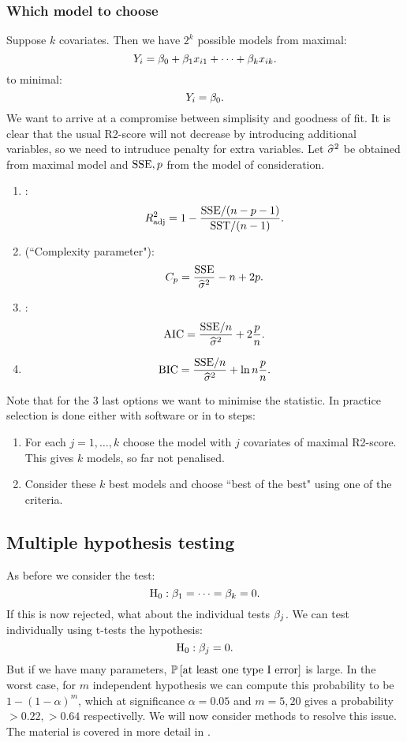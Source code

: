 \subsubsection{Which model to choose}
Suppose $k$ covariates. Then we have $2^k$ possible models from maximal:
$$
    Y_i = \beta_0+\beta_1x_{i1} + \dots + \beta_kx_{ik}.
$$
to minimal:
$$
    Y_i = \beta_0.
$$
We want to arrive at a compromise between simplisity and goodness of fit. It is clear that the usual R2-score will not decrease by introducing additional variables, so we need to intruduce penalty for extra variables. Let $\widehat{\sigma}^2$ be obtained from maximal model and $\mathrm{SSE}, p$ from the model of consideration.
\begin{enumerate}
    \item {}:
    $$
        R^2_{\mathrm{adj}} = 1 - \frac{\mathrm{SSE} / (n-p-1)}{\mathrm{SST} / (n-1)}.
    $$
    \item {} (``Complexity parameter"):
    $$
        C_p = \frac{\mathrm{SSE}}{\widehat{\sigma}^2} - n + 2p.
    $$
    \item {}:
    $$
        \mathrm{AIC} = \frac{\mathrm{SSE}/n}{\widehat{\sigma}^2} + 2\frac{p}{n}.
    $$
    \item {}
    $$
        \mathrm{BIC} = \frac{\mathrm{SSE}/n}{\widehat{\sigma}^2} + \ln{n}\frac{p}{n}.
    $$
\end{enumerate}
Note that for the 3 last options we want to minimise the statistic. In practice selection is done either with software or in to steps:
\begin{enumerate}
    \item For each $j=1,\dots,k$ choose the model with $j$ covariates of maximal R2-score. This gives $k$ models, so far not penalised.
    \item Consider these $k$ best models and choose ``best of the best" using one of the criteria. 
\end{enumerate}


\subsection{Multiple hypothesis testing}
As before we consider the test:
$$
    \mathrm{H}_0 : \beta_1=\dots=\beta_k = 0.
$$
If this is now rejected, what about the individual tests $\beta_j$. We can test individually using t-tests the hypothesis:
$$
    \mathrm{H}_0 : \beta_j = 0.
$$
But if we have many parameters, $\mathbb{P}\left[\textrm{at least one type I error}\right]$ is large. In the worst case, for $m$ independent hypothesis we can compute this probability to be $1-(1-\alpha)^m$, which at significance $\alpha=0.05$ and $m=5, 20$ gives a probability $>0.22, >0.64$ respectivelly. We will now consider methods to resolve this issue. The material is covered in more detail in \cite{Halle2017Multiple}.

